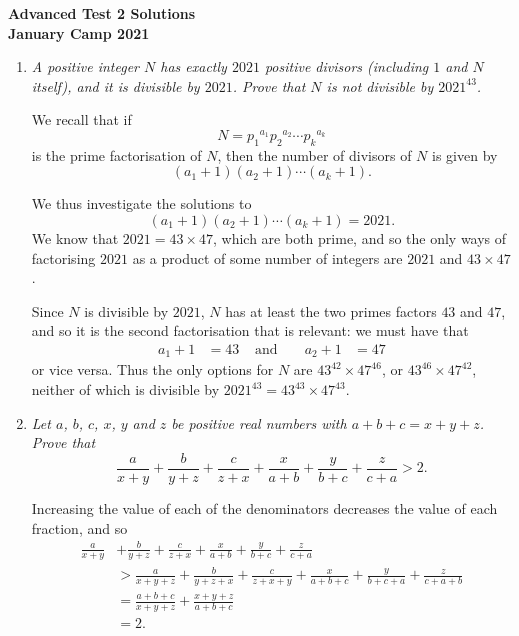 \documentclass{article}
\begin{document}
\thispagestyle{empty}

\begin{center}
  \textbf{\Large Advanced Test 2 Solutions}
  \\ \vspace{1em}
  \textbf{\large January Camp 2021}
\end{center}

\vspace{24pt}

\begin{enumerate}[1.]

  \item %
  {\itshape A positive integer $N$ has exactly $2021$ positive divisors (including $1$ and $N$ itself), and it is divisible by $2021$.
  Prove that $N$ is not divisible by $2021^{43}$.}

  We recall that if
  \[
    N = {p_1}^{a_1} {p_2}^{a_2} \cdots {p_k}^{a_k}
  \]
  is the prime factorisation of $N$, then the number of divisors of $N$ is given by
  \[
    (a_1 + 1)(a_2 + 1) \cdots (a_k + 1).
  \]

  We thus investigate the solutions to
  \[
    (a_1 + 1)(a_2 + 1) \cdots (a_k + 1) = 2021.
  \]
  We know that $2021 = 43 \times 47$, which are both prime, and so the only ways of factorising $2021$ as a product of some number of integers are $2021$ and $43 \times 47$.

  Since $N$ is divisible by $2021$, $N$ has at least the two primes factors $43$ and $47$, and so it is the second factorisation that is relevant: we must have that
  \begin{align*}
    a_1 + 1 & = 43 & \text{ and } && a_2 + 1 & = 47
  \end{align*}
  or vice versa. Thus the only options for $N$ are $43^{42} \times 47^{46}$, or $43^{46} \times 47^{42}$, neither of which is divisible by $2021^{43} = 43^{43} \times 47^{43}$.
  
  
  \item %
  {\itshape Let $a$, $b$, $c$, $x$, $y$ and $z$ be positive real numbers with $a + b + c = x + y + z$.
  Prove that 
  \[ \frac{a}{x + y} + \frac{b}{y + z} + \frac{c}{z + x} + \frac{x}{a + b} + \frac{y}{b + c} + \frac{z}{c + a} > 2. \]}

  Increasing the value of each of the denominators decreases the value of each fraction, and so
  \begin{align*}
    \frac{a}{x + y} & + \frac{b}{y + z} + \frac{c}{z + x} + \frac{x}{a + b} + \frac{y}{b + c} + \frac{z}{c + a} \\
    & > \frac{a}{x + y + z} + \frac{b}{y + z + x} + \frac{c}{z + x + y} + \frac{x}{a + b + c} + \frac{y}{b + c + a} + \frac{z}{c + a + b} \\
    & = \frac{a + b + c}{x + y + z} + \frac{x + y + z}{a + b + c} \\
    & = 2.
  \end{align*}
  

\end{enumerate}
\end{document}

